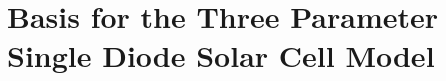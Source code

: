 \chapter{Basis for the Three Parameter Single Diode Solar Cell Model}\label{appendix:three_parameter_solar_cell}
